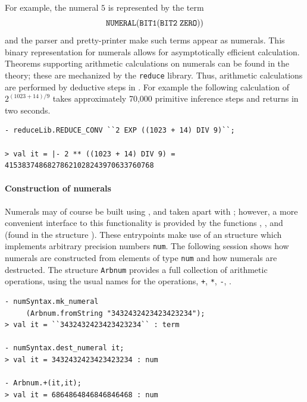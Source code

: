 \noindent For example, the numeral $5$ is represented by the term
\[
   \ml{NUMERAL}(\ml{BIT1}(\ml{BIT2}\;\ml{ZERO}))
\]
and the \HOL{} parser and pretty-printer make such terms appear as
numerals. This binary representation for numerals allows for
asymptotically efficient calculation. Theorems supporting arithmetic
calculations on numerals can be found in the 
theory; these are mechanized by the \verb+reduce+ library. Thus,
arithmetic calculations are performed by deductive steps in \HOL.
For example the following calculation of $2 ^{(1023 + 14)/9}$ takes
approximately 70,000 primitive inference steps and returns in two
seconds.
%
\setcounter{sessioncount}{0}
\begin{session}
\begin{verbatim}
- reduceLib.REDUCE_CONV ``2 EXP ((1023 + 14) DIV 9)``;

> val it = |- 2 ** ((1023 + 14) DIV 9) = 41538374868278621028243970633760768
\end{verbatim}
\end{session}

\paragraph {Construction of numerals}

Numerals may of course be built using , and taken apart with
; however, a more convenient interface to this
functionality is provided by the functions ,
, and  (found in the structure
). These entrypoints make use of an \ML{} structure
 which implements arbitrary precision numbers {\verb+num+}. The
following session shows how \HOL{} numerals are constructed from elements of
type \verb+num+ and how numerals are destructed. The structure
{\small\verb+Arbnum+} provides a full collection of arithmetic
operations, using the usual names for the operations, \eg \verb|+|,
\verb|*|, \verb|-|, \etc.

\begin{session}
\begin{verbatim}
- numSyntax.mk_numeral
     (Arbnum.fromString "3432432423423423234");
> val it = ``3432432423423423234`` : term

- numSyntax.dest_numeral it;
> val it = 3432432423423423234 : num

- Arbnum.+(it,it);
> val it = 6864864846846846468 : num
\end{verbatim}
\end{session}


